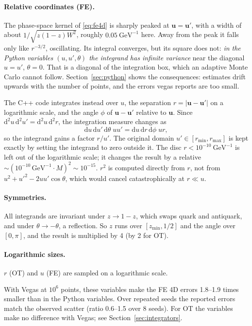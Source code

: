 \documentclass[11pt,a4paper]{article}
\newcommand{\dd}{\mathrm{d}}
\begin{document}
\paragraph{Relative coordinates (FE).}
The phase-space kernel of \eqref{eq:fe4d} is sharply peaked at
$\mathbf{u} = \mathbf{u}'$, with a width of about $1/\sqrt{z(1-z)W^2}$, roughly
$0.05\ \text{GeV}^{-1}$ here. Away from the peak it falls only like
$r^{-3/2}$, oscillating. Its integral converges, but its square does not:
\emph{in the Python variables $(u, u', \theta)$ the integrand has infinite
variance} near the diagonal $u = u'$, $\theta = 0$. That is a diagonal of the
integration box, which an adaptive Monte Carlo cannot follow. Section~\ref{sec:python}
shows the consequences: estimates drift upwards with the number of points, and
the errors vegas reports are too small.

The C++ code integrates instead over $u$, the separation
$r = |\mathbf{u} - \mathbf{u}'|$ on a logarithmic scale, and the angle $\phi$
of $\mathbf{u} - \mathbf{u}'$ relative to $\mathbf{u}$. Since
$\dd^2u\,\dd^2u' = \dd^2u\,\dd^2r$, the integration measure changes as
\begin{equation}
  \dd u \, \dd u' \, \dd\theta \; u u' = \dd u \, \dd r \, \dd\phi \; u r ,
\end{equation}
so the integrand gains a factor $r/u'$. The original domain
$u' \in [r_{\min}, r_{\max}]$ is kept exactly by setting the integrand to zero
outside it. The disc $r < 10^{-10}\ \text{GeV}^{-1}$ is left out of the
logarithmic scale; it changes the result by a relative
$\sim (10^{-10}\,\text{GeV}^{-1} \cdot M)^2 \sim 10^{-15}$. $r^2$ is computed
directly from $r$, not from $u^2 + u'^2 - 2uu'\cos\theta$, which would cancel
catastrophically at $r \ll u$.

\paragraph{Symmetries.}
All integrands are invariant under $z \to 1 - z$, which swaps quark and
antiquark, and under $\theta \to -\theta$, a reflection. So $z$ runs over
$[z_{\min}, 1/2]$ and the angle over $[0, \pi]$, and the result is multiplied
by 4 (by 2 for OT).

\paragraph{Logarithmic sizes.} $r$ (OT) and $u$ (FE) are sampled on a
logarithmic scale.

\medskip
With Vegas at $10^6$ points, these variables make the FE 4D errors 1.8--1.9
times smaller than in the Python variables. Over repeated seeds the reported
errors match the observed scatter (ratio 0.6--1.5 over 8 seeds). For OT the
variables make no difference with Vegas; see Section~\ref{sec:integrators}.
\end{document}
